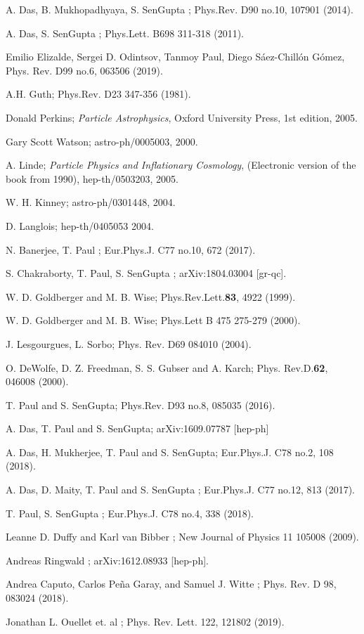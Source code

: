 \documentclass[a4paper]{article}
\begin{document}
\begin{thebibliography}{99}
 A. Das, B. Mukhopadhyaya, S. SenGupta ;  Phys.Rev. D90 no.10, 107901 (2014).
 
 A. Das, S. SenGupta ; Phys.Lett. B698 311-318 (2011).
 
 Emilio Elizalde, Sergei D. Odintsov, Tanmoy Paul, Diego Sáez-Chillón Gómez, Phys. Rev. D99 no.6, 063506 (2019).

A.H. Guth;  Phys.Rev. D23 347-356 (1981).

Donald Perkins; {\it Particle Astrophysics}, Oxford University Press, 1st edition, 2005.

Gary Scott Watson; astro-ph/0005003, 2000.

A. Linde; {\it Particle Physics and Inflationary Cosmology}, (Electronic version of the book from 1990), hep-th/0503203, 2005.

W. H. Kinney; astro-ph/0301448, 2004.

D. Langlois;  hep-th/0405053 2004.

N. Banerjee, T. Paul ; Eur.Phys.J. C77 no.10, 672 (2017).

S. Chakraborty, T. Paul, S. SenGupta ;  arXiv:1804.03004 [gr-qc].

 W. D. Goldberger and M. B. Wise; Phys.Rev.Lett.{\bf 83}, 4922 (1999).

  W. D. Goldberger and M. B. Wise; Phys.Lett B 475 275-279 (2000).
 
J. Lesgourgues, L. Sorbo; Phys. Rev. D69 084010 (2004).

 O. DeWolfe, D. Z. Freedman, S. S. Gubser and A. Karch; Phys.
Rev.D.{\bf 62}, 046008 (2000).

T. Paul and S. SenGupta;  Phys.Rev. D93 no.8, 085035 (2016).

A. Das, T. Paul and S. SenGupta; arXiv:1609.07787 [hep-ph] 

A. Das, H. Mukherjee, T. Paul and S. SenGupta; Eur.Phys.J. C78 no.2, 108 (2018).

A. Das, D. Maity, T. Paul and S. SenGupta ; Eur.Phys.J. C77 no.12, 813 (2017).

T. Paul, S. SenGupta ; Eur.Phys.J. C78 no.4, 338 (2018).

Leanne D. Duffy and Karl van Bibber ; New Journal of Physics 11 105008 (2009).

Andreas Ringwald ; arXiv:1612.08933 [hep-ph].

Andrea Caputo, Carlos Peña Garay, and Samuel J. Witte ; Phys. Rev. D 98, 083024 (2018).

Jonathan L. Ouellet et. al ; Phys. Rev. Lett. 122, 121802 (2019).

 
 
 
\end{thebibliography}












 
\end{document}
